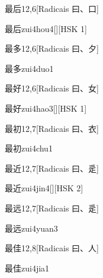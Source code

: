 \begin{entry}{最后}{12,6}[Radicais ⽈、⼝]
  \begin{phonetics}{最后}{zui4hou4}[][HSK 1]
  \end{phonetics}
\end{entry}

\begin{entry}{最多}{12,6}[Radicais ⽈、⼣]
  \begin{phonetics}{最多}{zui4duo1}
  \end{phonetics}
\end{entry}

\begin{entry}{最好}{12,6}[Radicais ⽈、⼥]
  \begin{phonetics}{最好}{zui4hao3}[][HSK 1]
  \end{phonetics}
\end{entry}

\begin{entry}{最初}{12,7}[Radicais ⽈、⾐]
  \begin{phonetics}{最初}{zui4chu1}
  \end{phonetics}
\end{entry}

\begin{entry}{最近}{12,7}[Radicais ⽈、⾡]
  \begin{phonetics}{最近}{zui4jin4}[][HSK 2]
  \end{phonetics}
\end{entry}

\begin{entry}{最远}{12,7}[Radicais ⽈、⾡]
  \begin{phonetics}{最远}{zui4yuan3}
  \end{phonetics}
\end{entry}

\begin{entry}{最佳}{12,8}[Radicais ⽈、⼈]
  \begin{phonetics}{最佳}{zui4jia1}
  \end{phonetics}
\end{entry}


